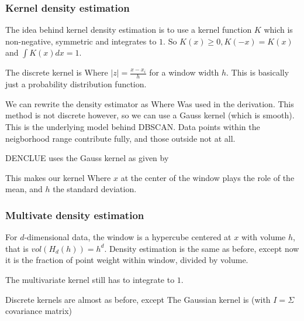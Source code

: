 \subsubsection{Kernel density estimation}
    The idea behind kernel density estimation is to use a kernel function $K$ which is non-negative, symmetric and integrates to $1$. So $K(x) \geq 0, K(-x) = K(x)$ and $\int{K(x) dx = 1}$.
    
    The discrete kernel is 
    Where $|z| = \frac{x - x_i}{h}$ for a window width $h$. This is basically just a probability distribution function.
    
    We can rewrite the density estimator as 
    Where 
    Was used in the derivation.
    This method is not discrete however, so we can use a Gauss kernel (which is smooth). This is the underlying model behind DBSCAN. Data points within the neigborhood range contribute fully, and those outside not at all. 
    
    DENCLUE uses the Gauss kernel as given by
    
    This makes our kernel
    Where $x$ at the center of the window plays the role of the mean, and $h$ the standard deviation. 
    
\subsubsection{Multivate density estimation}
    For $d$-dimensional data, the window is a hypercube centered at $x$ with volume $h$, that is $vol(H_d(h)) = h^d$. Density estimation is the same as before, except now it is the fraction of point weight within window, divided by volume. 
    
    The multivariate kernel still has to integrate to $1$. 
    
    Discrete kernels are almost as before, except
    The Gaussian kernel is (with $I = \Sigma$ covariance matrix)
